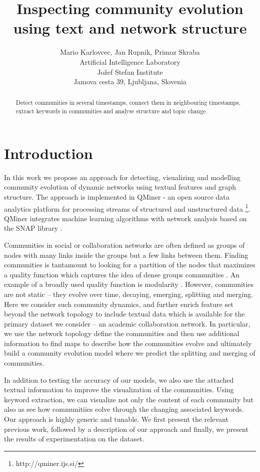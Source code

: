 \documentclass{article} %
\title{Inspecting community evolution using text and network structure}
\author{
Mario Karlovcec, Jan Rupnik, Primoz Skraba \\
Artificial Intelligence Laboratory\\
Jožef Stefan Institute\\
Jamova cesta 39, Ljubljana, Slovenia \\
}
\begin{document}
\maketitle

\begin{abstract}
Detect communities in several timestamps, connect them in neighbouring timestamps, extract keywords in communities and analyse structure and topic change.
\end{abstract}

\section{Introduction}


In this work we propose an approach for detecting, visualizing and
modelling community evolution of dynamic networks using textual
features and graph structure. The approach is implemented in QMiner -
an open source data analytics platform for processing streams of
structured and unstructured data \footnote{http://qminer.ijs.si/}.
QMiner integrates machine learning algorithms with network analysis
based on the SNAP library \cite{snap}.


Communities in social or collaboration networks are often defined as
groups of nodes with many links inside the groups but a few links
between them. Finding communities is tantamount to looking for a
partition of the nodes that maximizes a quality function which
captures the idea of dense groups communities \cite{aynaud}. An
example of a broadly used quality function is modularity
\cite{newman2003}. However, communities are not static -- they evolve
over time, decaying, emerging, splitting and merging. Here we consider
such community dynamics, and further enrich feature set beyond the
network topology to include textual data which is available for the
primary dataset we consider -- an academic collaboration network. In particular, we use
the network topology define the communities and then use additional
information to find maps to describe how the communities evolve and
ultimately build a community evolution model where we predict the
splitting and merging of communities.


In addition to testing the accuracy of our models, we also use the
attached textual information to improve the visualization of the
communities. Using keyword extraction, we can visualize not only the
content of each community but also as see how communitiies eolve
through the changing associated keywords. Our approach is highly
generic and tunable. We first present the relevant previous work,
followed by a description of our approach and finally, we present the
results of experimentation on the dataset.
\end{document}

